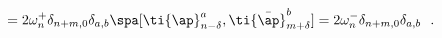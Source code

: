\begin{equation}
[\ap^a_{n+\delta},\bar{\ap}^b_{m-\delta}]
=2\omega^+_{n}\delta_{n+m,0}\delta_{a,b} \spa
[\ti{\ap}^a_{n-\delta},\ti{\bar{\ap}}^b_{m+\delta}]
=2\omega^-_{n}\delta_{n+m,0}\delta_{a,b} \ \ .
\end{equation}

